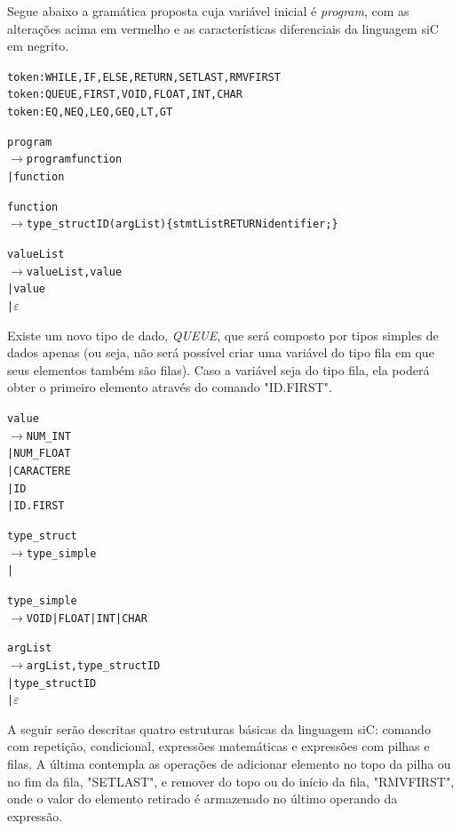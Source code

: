 \documentclass[12pt]{article}
\begin{document}
Segue abaixo a gramática proposta cuja variável inicial é \textit{program}, com as alterações acima em vermelho e as características diferenciais da linguagem siC em negrito.


\begin{alltt}{\footnotesize
token: WHILE, IF, ELSE, RETURN, {\color{red}SETLAST}, {\color{red}RMVFIRST}
token: QUEUE, FIRST, VOID, FLOAT, INT, CHAR
token: {\color{red}EQ, NEQ, LEQ, GEQ, LT, GT}

{\color{red}program
   \(\to\) program function
   | function}

function
   \(\to\) {\color{red}type\_struct ID} ( argList ) \{ stmtList RETURN identifier ; \}
    
{\color{red}valueList
	\(\to\) valueList , value
	| value
	| \(\varepsilon\)}
	
}\end{alltt}
\indent Existe um novo tipo de dado, \textit{QUEUE}, que será composto por tipos simples de dados apenas (ou seja, não será possível criar uma variável do tipo fila em que seus elementos também são filas). Caso a variável seja do tipo fila, ela poderá obter o primeiro elemento através do comando "ID.FIRST".
\begin{alltt}{\footnotesize    	
	
{\color{red}value
	\(\to\) NUM\_INT
	| NUM\_FLOAT
	| CARACTERE
	| ID
	| ID . FIRST}
	
type\_struct
   \(\to\) type\_simple
    | \color{red}{QUEUE GT type\_simple LT}
    
type\_simple
   \(\to\) VOID | FLOAT | INT | CHAR  

argList
   \(\to\) argList , {\color{red}type\_struct ID}
   | {\color{red}type\_struct ID}
   | \(\varepsilon\)

   
}\end{alltt}
\indent A seguir serão descritas quatro estruturas básicas da linguagem siC: comando com repetição, condicional, expressões matemáticas e expressões com pilhas e filas. A última contempla as operações de adicionar elemento no topo da pilha ou no fim da fila, "SETLAST", e remover do topo ou do início da fila, "RMVFIRST", onde o valor do elemento retirado é armazenado no último operando da expressão.
\end{document}
